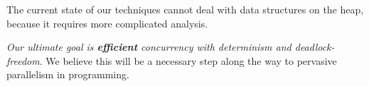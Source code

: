 \documentclass[preprint]{sigplanconf}
\begin{document}
The current state of our techniques cannot deal with data structures on the heap,
because it requires more complicated analysis.

{\it Our ultimate goal is {\bf \it efficient} concurrency
 with determinism and  deadlock-freedom}.
We believe this will be a necessary
step along the way to pervasive parallelism in programming.
\end{document}
